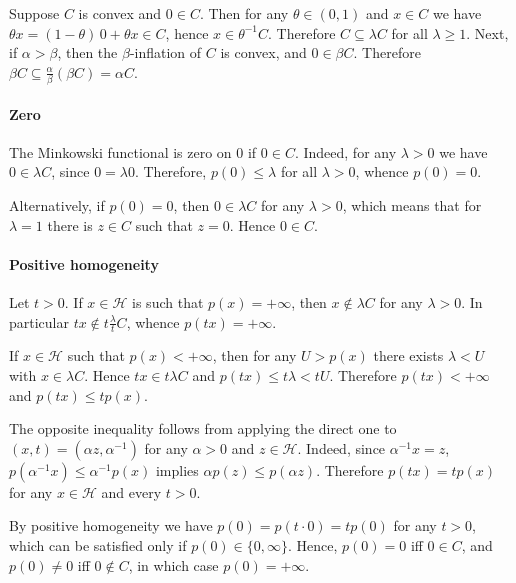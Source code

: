 \documentclass[a4paper]{article}
\newcommand{\Hcal}{\mathcal{H}}
\begin{document}
Suppose $C$ is convex and $0\in C$. Then for any $\theta \in (0, 1)$ and $x\in C$
we have $\theta x = (1 - \theta)\, 0 + \theta x \in C$, hence $x \in \theta^{-1} C$.
Therefore $C \subseteq \lambda C$ for all $\lambda \geq 1$. Next, if $\alpha > \beta$,
then the $\beta$-inflation of $C$ is convex, and $0 \in \beta C$. Therefore $\beta C
\subseteq \tfrac\alpha\beta (\beta C) = \alpha C$.


\paragraph{Zero} %
\label{par:zero}

The Minkowski functional is zero on $0$ if $0\in C$. Indeed, for any $\lambda > 0$
we have $0 \in \lambda C$, since $0 = \lambda 0$. Therefore, $p(0) \leq \lambda$
for all $\lambda > 0$, whence $p(0) = 0$.

Alternatively, if $p(0) = 0$, then $0\in \lambda C$ for any $\lambda > 0$, which
means that for $\lambda=1$ there is $z\in C$ such that $z = 0$. Hence $0\in C$.


\paragraph{Positive homogeneity} %
\label{par:pos_homogeneity}

Let $t > 0$. If $x\in\Hcal$ is such that $p(x) = +\infty$, then $x\notin \lambda C$
for any $\lambda>0$. In particular $t x\notin t \tfrac\lambda{t} C$, whence $p(tx)
= +\infty$.

If $x \in \Hcal$ such that $p(x) < +\infty$, then for any $U > p(x)$ there exists
$\lambda < U$ with $x\in \lambda C$. Hence $t x \in t \lambda C$ and $p(t x) \leq
t \lambda < t U$. Therefore $p(t x) < +\infty$ and $p(t x) \leq t p(x)$.

The opposite inequality follows from applying the direct one to $(x, t) = (\alpha
z, \alpha^{-1})$ for any $\alpha > 0$ and $z \in \Hcal$. Indeed, since $\alpha^{-1}
x = z$, $p(\alpha^{-1} x) \leq \alpha^{-1} p(x)$ implies $\alpha p(z) \leq p(\alpha z)$.
Therefore $p(t x) = t p(x)$ for any $x \in \Hcal$ and every $t > 0$.

By positive homogeneity we have $p(0) = p(t \cdot 0) = t p(0)$ for any $t > 0$, which
can be satisfied only if $p(0) \in \{0, \infty\}$. Hence, $p(0) = 0$ iff $0\in C$, 
and $p(0)\neq 0$ iff $0\notin C$, in which case $p(0) = +\infty$.
\end{document}
